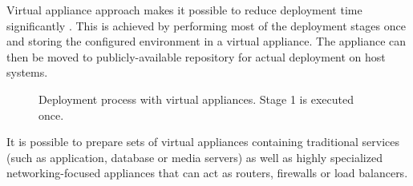 \documentclass[11pt]{book}
\begin{document}

        Virtual appliance approach makes it possible to reduce deployment time significantly \cite{changhua}. This is
        achieved by performing most of the deployment stages once and storing the configured environment in a virtual
        appliance. The appliance can then be moved to publicly-available repository for actual deployment on host
        systems.

        \begin{figure}[H]
          \begin{center}
          \end{center}

          \caption{Deployment process with virtual appliances. Stage 1 is executed once.}
        \end{figure}

        It is possible to prepare sets of virtual appliances containing traditional services (such as application,
        database or media servers) as well as highly specialized networking-focused appliances that can act as routers,
        firewalls or load balancers.
        
\end{document}
